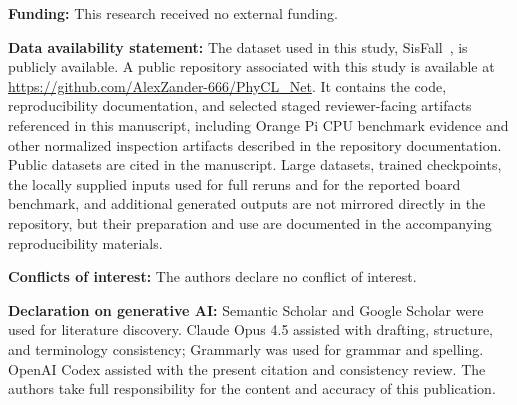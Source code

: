 \documentclass[jec]{acnsart}
\begin{document}
\vspace{0.5em}
\noindent\textbf{Funding:} This research received no external funding.

\vspace{0.5em}
\noindent\textbf{Data availability statement:} The dataset used in this study, SisFall~\cite{sucerquia2017sisfall}, is publicly available. A public repository associated with this study is available at \url{https://github.com/AlexZander-666/PhyCL_Net}. It contains the code, reproducibility documentation, and selected staged reviewer-facing artifacts referenced in this manuscript, including Orange Pi CPU benchmark evidence and other normalized inspection artifacts described in the repository documentation. Public datasets are cited in the manuscript. Large datasets, trained checkpoints, the locally supplied inputs used for full reruns and for the reported board benchmark, and additional generated outputs are not mirrored directly in the repository, but their preparation and use are documented in the accompanying reproducibility materials.

\vspace{0.5em}
\noindent\textbf{Conflicts of interest:} The authors declare no conflict of interest.

\vspace{0.5em}
\noindent\textbf{Declaration on generative AI:} Semantic Scholar and Google Scholar were used for literature discovery. Claude Opus 4.5 assisted with drafting, structure, and terminology consistency; Grammarly was used for grammar and spelling. OpenAI Codex assisted with the present citation and consistency review. The authors take full responsibility for the content and accuracy of this publication.


\end{document}
